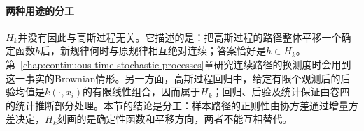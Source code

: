 \paragraph{两种用途的分工}
$H_k$并没有因此与高斯过程无关。它描述的是：把高斯过程的路径整体平移一个确定函数$h$后，新规律何时与原规律相互绝对连续；答案恰好是$h\in H_k$。第~\ref{chap:continuous-time-stochastic-processes}章研究连续路径的换测度时会用到这一事实的Brownian情形。另一方面，高斯过程回归中，给定有限个观测后的后验均值是$k(\cdot,x_i)$的有限线性组合，因而属于$H_k$；回归、后验及统计保证由卷四的统计推断部分处理。本节的结论是分工：样本路径的正则性由协方差通过增量方差决定，$H_k$刻画的是确定性函数和平移方向，两者不能互相替代。
